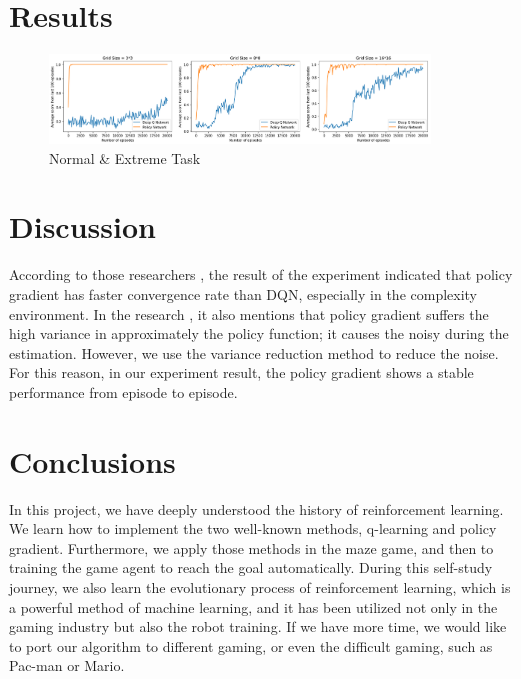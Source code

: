 \documentclass[article]{aaltoseries}
\begin{document}


\section{Results}

\begin{figure}[t!]
  \begin{center}
    \includegraphics[width=0.9\textwidth]{figures/normal&extream}
    \caption{Normal \& Extreme Task}
    \label{fig:normal_extreme}
  \end{center}
\end{figure}




\section{Discussion}

According to those researchers \cite{DBLP:journals/corr/SchulmanAC17, deepcompareurl}, the result of the experiment indicated that policy gradient has faster convergence rate than DQN, especially in the complexity environment. In the research \cite{deepcompareurl}, it also mentions that policy gradient suffers the high variance in approximately the policy function; it causes the noisy during the estimation. However, we use the variance reduction method to reduce the noise. For this reason, in our experiment result, the policy gradient shows a stable performance from episode to episode.



\section{Conclusions}

In this project, we have deeply understood the history of reinforcement learning. We learn how to implement the two well-known methods, q-learning and policy gradient. Furthermore, we apply those methods in the maze game, and then to training the game agent to reach the goal automatically. During this self-study journey, we also learn the evolutionary process of reinforcement learning, which is a powerful method of machine learning, and it has been utilized not only in the gaming industry but also the robot training. If we have more time, we would like to port our algorithm to different gaming, or even the difficult gaming, such as Pac-man or Mario.
\end{document}
